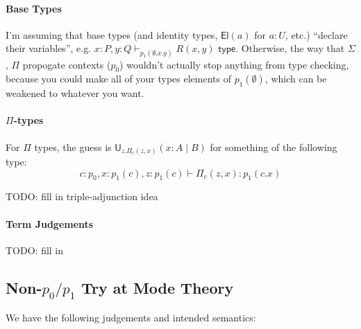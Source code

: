 \documentclass[10pt]{article}
\newcommand{\yields}{\vdash}
\newcommand{\type}{\,\,\mathsf{type}}
\newcommand\U[3]{\ensuremath{\mathsf{U}_{#1}(#2 \mid #3)}}
\begin{document}
\paragraph{Base Types}

I'm assuming that base types (and identity types, $\mathsf{El}(a)$ for
$a : U$, etc.) ``declare their variables'', e.g. $x : P, y : Q
\vdash_{p_1(\emptyset.x.y)} R(x,y) \type$.  Otherwise, the way that
$\Sigma$, $\Pi$ propogate contexts ($p_0$) wouldn't actually stop
anything from type checking, because you could make all of your types
elements of $p_1(\emptyset)$, which can be weakened to whatever you
want.

\paragraph{$\Pi$-types}

For $\Pi$ types, the guess is $\U{z.\Pi_c(z,x)}{x : A}{B}$ for something
of the following type:
\[ 
c : p_0, x : p_1(c), z : p_1(c) \yields \Pi_c(z,x) : p_1(c.x) 
\]

TODO: fill in triple-adjunction idea

\paragraph{Term Judgements}  

TODO: fill in

\subsection{Non-$p_0/p_1$ Try at Mode Theory}

We have the following judgements and intended semantics:
\end{document}
